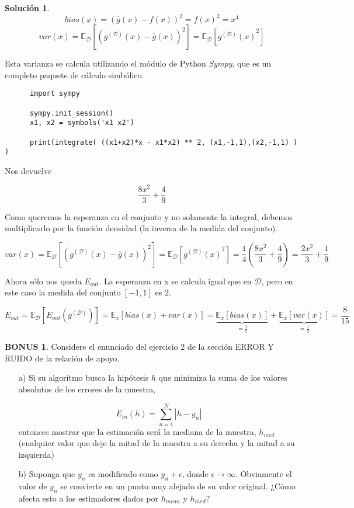 \documentclass[a4paper, 11pt]{article}
\theoremstyle{definition}
\newtheorem*{solucion}{Solución}
\newtheorem*{bonus}{BONUS}
\begin{document}
\begin{solucion}
    $$ bias(x) = {(\overline{g}(x) - f(x))}^2 = f(x)^2 = x^4 $$
    $$ var(x) = \mathbb{E}_\mathcal{D}\left[ {(g^{(\mathcal{D})}(x) - \overline{g}(x) )}^2 \right] = \mathbb{E}_\mathcal{D}\left[ {g^{(\mathcal{D})}(x)}^2 \right] $$

    Esta varianza se calcula utilizando el módulo de Python \emph{Sympy}, que es un completo paquete de cálculo simbólico.

    \begin{lstlisting}
      import sympy

      sympy.init_session()
      x1, x2 = symbols('x1 x2')

      print(integrate( ((x1+x2)*x - x1*x2) ** 2, (x1,-1,1),(x2,-1,1) ) )
    \end{lstlisting}
    Nos devuelve

    $$ \frac{8 x^{2}}{3} + \frac{4}{9}$$

    Como queremos la esperanza en el conjunto y no solamente la integral, debemos multiplicarlo por la función densidad (la inversa de la medida del conjunto).

    $$var(x) = \mathbb{E}_\mathcal{D}\left[ {(g^{(\mathcal{D})}(x) - \overline{g}(x) )}^2 \right] = \mathbb{E}_\mathcal{D}\left[ {g^{(\mathcal{D})}(x)}^2 \right] = \frac{1}{4} \left(\frac{8 x^{2}}{3} + \frac{4}{9} \right) = \frac{2 x^{2}}{3} + \frac{1}{9}$$

    Ahora sólo nos queda $E_{out}$. La esperanza en x se calcula igual que en $\mathcal{D}$, pero en este caso la medida del conjunto $[-1,1]$ es $2$.

    $$ E_{out} = \mathbb{E}_\mathcal{D}\left[E_{out}(g^{(\mathcal{D})}) \right] = \mathbb{E}_x \left[ bias(x) + var(x)  \right] = \underbrace{\mathbb{E}_x \left[ bias(x) \right]}_{= \frac{1}{5}} + \underbrace{\mathbb{E}_x \left[ var(x)  \right]}_{=\frac{1}{3}} =  \frac{8}{15}$$

  \end{solucion}


  \begin{bonus}
    Considere el enunciado del ejercicio 2 de la sección ERROR Y RUIDO de la relación de apoyo.
    \begin{itemize}
      \item[a)] Si su algoritmo busca la hipótesis $h$ que minimiza la suma de los valores absolutos de los errores de la muestra,

      \[
      E_{in}(h) = \sum_{n=1}^N{|h-y_n|}
      \]
      entonces mostrar que la estimación será la mediana de la muestra, $h_{med}$ (cualquier valor que deje la mitad de la muestra a su derecha y la mitad a su izquierda)

      \item[b)] Suponga que $y_n$ es modificado como $y_n + \epsilon$, donde $\epsilon \rightarrow \infty$. Obviamente el valor de $y_n$ se convierte en un punto muy alejado de su valor original. ¿Cómo afecta esto a los estimadores dados por $h_{mean}$ y $h_{med}$?
    \end{itemize}
  \end{bonus}
\end{document}
